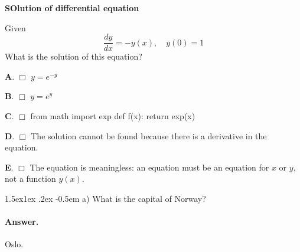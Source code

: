 \documentclass[%
oneside,                 %
final,                   %
10pt]{article}
\makeatletter
\newenvironment{doconcequiz}{}{}
\newcounter{doconcequizcounter}
\newenvironment{doconceexercise}{}{}
\newcounter{doconceexercisecounter}
\newcommand\subex{\@startsection{paragraph}{4}{\z@}%
                  {1.5ex\@plus1ex \@minus.2ex}%
                  {-0.5em}%
                  {\normalfont\normalsize\bfseries}}
\theoremstyle{definition}
\makeatother
\begin{document}
\begin{enumerate}
\begin{doconceexercise}
\eccq

\end{doconceexercise}
\begin{doconceexercise}
                             
\label{sec:this:exer:de}

\begin{doconcequiz}
\label{quiz:diff:eq1}


\noindent\textbf{\large SOlution of differential equation}

\noindent
Given
\[ \frac{dy}{dx} = -y(x),\quad y(0)=1 \]
What is the solution of this equation?

\vspace{2mm}

\textbf{A}. $\Box$ 
$y=e^{-y}$

\textbf{B}. $\Box$ 
$y=e^{y}$

\textbf{C}. $\Box$ 
\bpycod
from math import exp
def f(x):
    return exp(x)

\epycod

\textbf{D}. $\Box$ 
The solution cannot be found because there is a derivative in the equation.

\textbf{E}. $\Box$ 
The equation is meaningless: an equation must be an equation
for $x$ or $y$, not a function $y(x)$.



\vspace{3mm}

\end{doconcequiz}


\end{doconceexercise}
\begin{doconceexercise}
                             
\subex{a)}
What is the capital of Norway?
\paragraph{Answer.}
Oslo.
\end{doconceexercise}

\end{enumerate}
\end{document}
